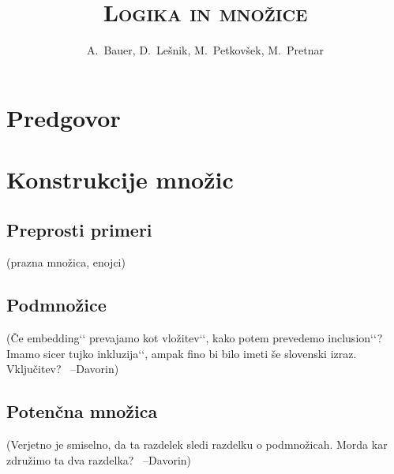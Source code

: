 \documentclass[11pt,a4paper,twoside]{book}
\newcommand{\davorin}[1]{{\small\textcolor{davorincolor}{(#1 \ \mbox{--Davorin})}}}
\newcommand{\note}[1]{{\small\textcolor{notecolor}{(#1)}}}
\newcommand{\qt}[1]{{\quotedblbase}{#1}{‘‘}}  %
\begin{document}
   
	
	\title{\Huge \textbf{\textsc{Logika in množice}}}
	\author{A.~Bauer, D.~Lešnik, M.~Petkovšek, M.~Pretnar}
	
	\maketitle
   
   

   \chapter*{Predgovor}%


	
	
	\tableofcontents
	\listoftables
	
	
	
	
	
	
	
	
	\chapter{Konstrukcije množic}
		\section{Preprosti primeri}
			\note{prazna množica, enojci}
		\section{Podmnožice}
			\davorin{Če \qt{embedding} prevajamo kot \qt{vložitev}, kako potem prevedemo \qt{inclusion}? Imamo sicer tujko \qt{inkluzija}, ampak fino bi bilo imeti še slovenski izraz. Vključitev?}
		\section{Potenčna množica}
			\davorin{Verjetno je smiselno, da ta razdelek sledi razdelku o podmnožicah. Morda kar združimo ta dva razdelka?}
\end{document}
